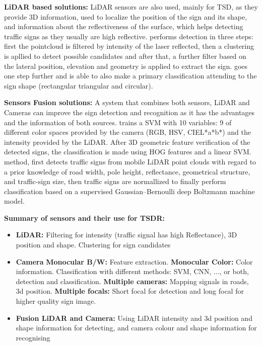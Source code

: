 \begin{flushleft} \textbf{LiDAR based solutions:}
LiDAR sensors are also used, mainly for TSD, as they provide 3D information, used to localize the position of the sign and its shape, and information about the reflectiveness of the surface, which helps detecting traffic signs as they usually are high reflective. \cite{gargoum2017automated} performs detection in three steps: first the pointcloud is filtered by intensity of the laser reflected, then a clustering is apllied to detect possible candidates and after that, a further filter based on the lateral position, elevation and geometry is applied to extract the sign. \cite{weng2016road} goes one step further and is able to also make a primary classification attending to the sign shape (rectangular triangular and circular).
\end{flushleft}

\begin{flushleft} \textbf{Sensors Fusion solutions:}
A system that combines both sensors, LiDAR and Cameras can improve the sign detection and recognition as it has the advantages and the information of both sources. \cite{zhou2014lidar} trains a SVM with 10 variables: 9 of different color spaces provided by the camera (RGB, HSV, CIEL*a*b*) and the intensity provided by the LiDAR. After 3D geometric feature verification of the detected signs, the classification is made using HOG features and a linear SVM. \cite{guan2018robust} method, first detects traffic signs from mobile LiDAR point clouds with regard to a prior knowledge of road width, pole height, reflectance, geometrical structure, and traffic-sign size, then traffic signs are normallized to finally perform classification based on a supervised Gaussian–Bernoulli deep Boltzmann machine model.
\end{flushleft}

\newpage
\begin{flushleft}
\textbf{Summary of sensors and their use for TSDR:}
\begin{itemize}[leftmargin=20mm,labelsep=5.8mm]
\item \textbf{LiDAR:} Filtering for intensity (traffic signal has high Reflectance), 3D position and shape. Clustering for sign candidates
\item \textbf{Camera}
\subitem \textbf{Monocular B/W:} Feature extraction.
\subitem \textbf{Monocular Color:} Color information. Classification with different methods:  SVM, CNN, ..., or both, detection and classification.
\subitem \textbf{Multiple cameras:} Mapping signals in roads, 3d position.
\subitem \textbf{Multiple focals:} Short focal for detection and long focal for higher quality sign image.
\item \textbf{Fusion LiDAR and Camera:} Using LiDAR intensity and 3d position and shape information for detecting, and camera colour and shape information for recognising
\end{itemize}
\end{flushleft}

